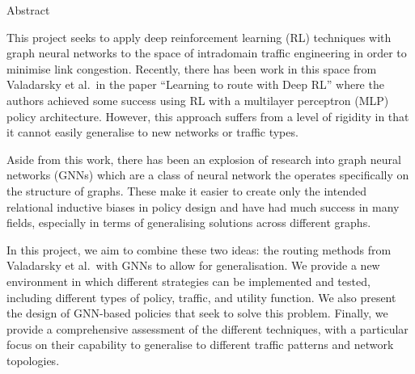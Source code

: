 \newpage
{\Huge Abstract}
\vspace{24pt}

This project seeks to apply deep reinforcement learning (RL) techniques with graph neural networks to the space of intradomain traffic engineering in order to minimise link congestion. Recently, there has been work in this space from Valadarsky et al.\ in the paper \enquote{Learning to route with Deep RL} where the authors achieved some success using RL with a multilayer perceptron (MLP) policy architecture. However, this approach suffers from a level of rigidity in that it cannot easily generalise to new networks or traffic types.

Aside from this work, there has been an explosion of research into graph neural networks (GNNs) which are a class of neural network the operates specifically on the structure of graphs. These make it easier to create only the intended relational inductive biases in policy design and have had much success in many fields, especially in terms of generalising solutions across different graphs.

In this project, we aim to combine these two ideas: the routing methods from Valadarsky et al.\ with GNNs to allow for generalisation. We provide a new environment in which different strategies can be implemented and tested, including different types of policy, traffic, and utility function. We also present the design of GNN-based policies that seek to solve this problem. Finally, we provide a comprehensive assessment of the different techniques, with a particular focus on their capability to generalise to different traffic patterns and network topologies.

\newpage
\vspace*{\fill}
